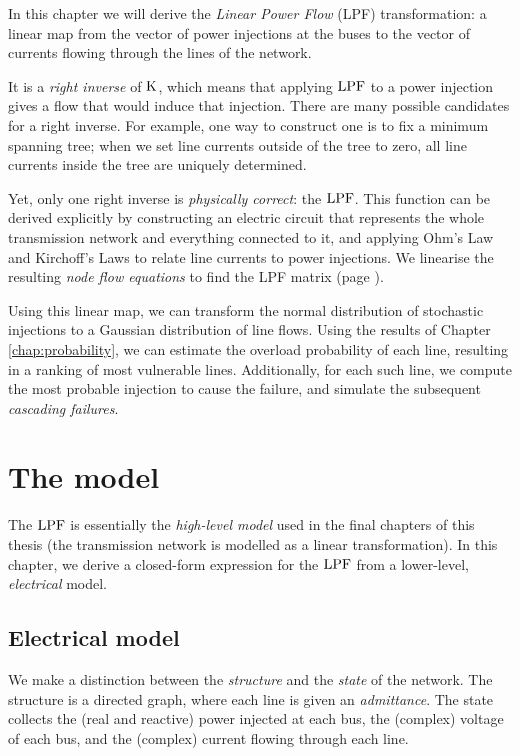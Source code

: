 \documentclass[main.tex]{subfiles}
\begin{document}
In this chapter we will derive the \emph{Linear Power Flow} (LPF) transformation: a linear map from the vector of power injections at the buses to the vector of currents flowing through the lines of the network.

It is a \emph{right inverse} of $\text{\textup{K}}$, which means that applying $\text{\textup{LPF}}$ to a power injection gives a flow that would induce that injection. There are many possible candidates for a right inverse. For example, one way to construct one is to fix a minimum spanning tree; when we set line currents outside of the tree to zero, all line currents inside the tree are uniquely determined.

Yet, only one right inverse is \emph{physically correct}: the $\text{\textup{LPF}}$. This function can be derived explicitly by constructing an electric circuit that represents the whole transmission network and everything connected to it, and applying Ohm's Law and Kirchoff's Laws to relate line currents to power injections. We linearise the resulting \emph{node flow equations} to find the LPF matrix (page \pageref{eq:LPF}).

Using this linear map, we can transform the normal distribution of stochastic injections to a Gaussian distribution of line flows. Using the results of Chapter \ref{chap:probability}, we can estimate the overload probability of each line, resulting in a ranking of most vulnerable lines. Additionally, for each such line, we compute the most probable injection to cause the failure, and simulate the subsequent \emph{cascading failures}.

\section{The model}
The $\text{\textup{LPF}}$ is essentially the \emph{high-level model} used in the final chapters of this thesis (\ie the transmission network is modelled as a linear transformation). In this chapter, we derive a closed-form expression for the $\text{\textup{LPF}}$ from a lower-level, \emph{electrical} model.

\subsection{Electrical model}
We make a distinction between the \emph{structure} and the \emph{state} of the network. The structure is a directed graph, where each line is given an \emph{admittance}. The state collects the (real and reactive) power injected at each bus, the (complex) voltage of each bus, and the (complex) current flowing through each line.
\end{document}
